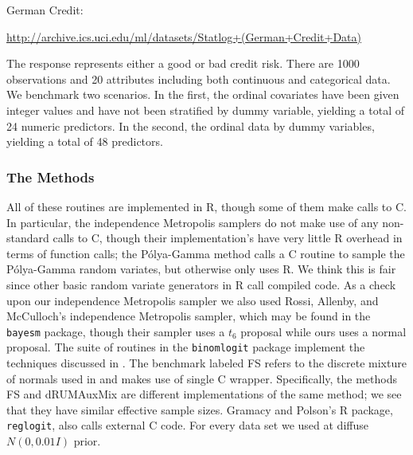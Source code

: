 \documentclass{article}
\newcommand{\Polya}{P\'{o}lya}
\begin{document}
\begin{outline}
\1 German Credit: 

\url{http://archive.ics.uci.edu/ml/datasets/Statlog+(German+Credit+Data)}

The response represents either a good or bad credit risk.  There are 1000
observations and 20 attributes including both continuous and categorical data.
We benchmark two scenarios.  In the first, the ordinal covariates have been
given integer values and have not been stratified by dummy variable, yielding a
total of 24 numeric predictors.  In the second, the ordinal data by dummy
variables, yielding a total of 48 predictors.

\end{outline}

\subsubsection{The Methods}

All of these routines are implemented in R, though some of them make calls to C.
In particular, the independence Metropolis samplers do not make use of any
non-standard calls to C, though their implementation's have very little R
overhead in terms of function calls; the \Polya-Gamma method calls a C routine
to sample the \Polya-Gamma random variates, but otherwise only uses R.  We think
this is fair since other basic random variate generators in R call compiled
code.  As a check upon our independence Metropolis sampler we also used Rossi,
Allenby, and McCulloch's independence Metropolis sampler, which may be found in
the \texttt{bayesm} package, though their sampler uses a $t_6$ proposal while
ours uses a normal proposal.  The suite of routines in the \texttt{binomlogit}
package implement the techniques discussed in
\cite{fruhwirth-schnatter-fruhwirth-2010}.  The benchmark labeled FS refers to
the discrete mixture of normals used in
\cite{fruhwirth-schnatter-fruhwirth-2010} and makes use of single C wrapper.
Specifically, the methods FS and dRUMAuxMix are different implementations of the
same method; we see that they have similar effective sample sizes.  Gramacy and
Polson's R package, \texttt{reglogit}, also calls external C code.  For every
data set we used at diffuse $N(0, 0.01 I)$ prior.
\end{document}
